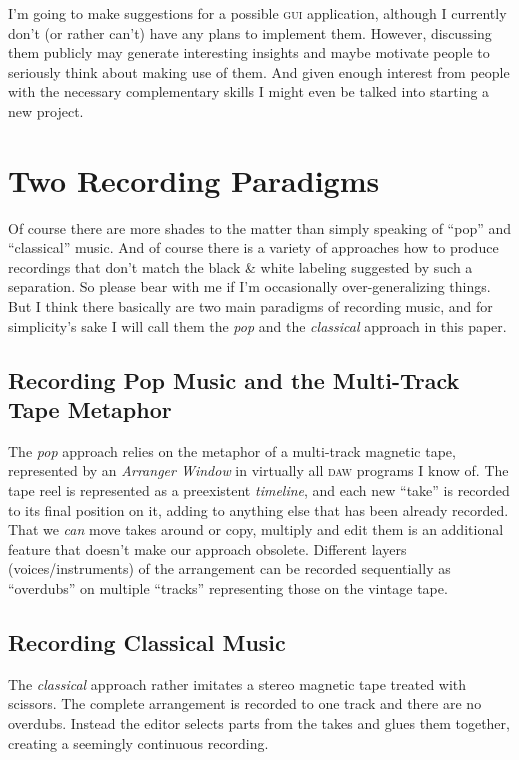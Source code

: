 \documentclass[11pt,a4paper]{article}
\begin{document}
I'm going to make suggestions for a possible \textsc{gui} application, although I currently don't (or rather can't) have any plans to implement them.
However, discussing them publicly may generate interesting insights and maybe motivate people to seriously think about making use of them.
And given enough interest from people with the necessary complementary skills I might even be talked into starting a new project.

\section{Two Recording Paradigms}

Of course there are more shades to the matter  than simply speaking of “pop” and “classical” music.
And of course there is a variety of approaches how to produce recordings that don't match the black \& white labeling suggested by such a separation.
So please bear with me if I'm occasionally over-generalizing things.
But I think there basically are two main paradigms of recording music, and for simplicity's sake I will call them the \emph{pop} and the \emph{classical} approach in this paper.

\subsection{Recording Pop Music and the Multi-Track Tape Metaphor}

The \emph{pop} approach relies on the metaphor of a multi-track magnetic tape, represented by an \emph{Arranger Window} in virtually all \textsc{daw} programs I know of.
The tape reel is represented as a preexistent \emph{timeline}, and each new “take” is recorded to its final position on it, adding to anything else that has been already recorded.
That we \emph{can} move takes around or copy, multiply and edit them is an additional feature that doesn't make our approach obsolete.
Different layers (voices/instruments) of the arrangement can be recorded sequentially as “overdubs” on multiple “tracks” representing those on the vintage tape.

\subsection{Recording Classical Music}
 
The \emph{classical} approach rather imitates a stereo magnetic tape treated with scissors.
The complete arrangement is recorded to one track and there are no overdubs.
Instead the editor selects parts from the takes and glues them together, creating a seemingly continuous recording.
\end{document}
